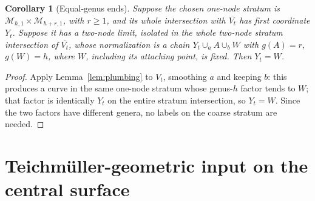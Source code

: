 \documentclass[11pt]{article}
\newcommand{\M}{\mathcal M}
\newcommand{\cl}[1]{\overline{#1}}
\newtheorem{corollary}[theorem]{Corollary}
\theoremstyle{remark}
\begin{document}
\begin{corollary}[Equal-genus ends]\label{cor:symmetric}
Suppose the chosen one-node stratum is
\(\M_{h,1}\times\M_{h+r,1}\), with \(r\geq1\), and its whole
intersection with \(\cl{V_t}\) has first coordinate \(Y_t\).
Suppose it has a two-node limit, isolated in the
\emph{whole} two-node stratum intersection of \(\cl{V_t}\),
whose normalization is a chain
\(Y_t\cup_a A\cup_b W\) with \(g(A)=r\), \(g(W)=h\),
where \(W\), including its attaching point, is fixed.
Then \(Y_t=W\).
\end{corollary}

\begin{proof}
Apply Lemma~\ref{lem:plumbing} to \(V_t\), smoothing \(a\) and keeping
\(b\): this produces a curve in the same one-node stratum whose
genus-\(h\) factor tends to \(W\); that factor is identically \(Y_t\)
on the entire stratum intersection, so \(Y_t=W\). Since the two
factors have different genera, no labels on the coarse stratum are
needed.
\end{proof}

\section{Teichm\"uller-geometric input on the central surface}\label{sec:teich}
\end{document}
